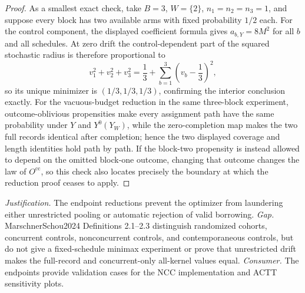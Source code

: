 \documentclass{article}
\begin{document}
\begin{proof}
As a smallest exact check, take \(B=3\), \(W=\{2\}\), \(n_1=n_2=n_3=1\), and suppose every block has two available arms with fixed probability \(1/2\) each.  For the control component, the displayed coefficient formula gives \(a_{b,Y}=8M^2\) for all \(b\) and all schedules.  At zero drift the control-dependent part of the squared stochastic radius is therefore proportional to
\[
 v_1^2+v_2^2+v_3^2
 =\frac13+\sum_{b=1}^3\left(v_b-\frac13\right)^2,
\]
so its unique minimizer is \((1/3,1/3,1/3)\), confirming the interior conclusion exactly.  For the vacuous-budget reduction in the same three-block experiment, outcome-oblivious propensities make every assignment path have the same probability under \(Y\) and \(Y^0(Y_W)\), while the zero-completion map makes the two full records identical after completion; hence the two displayed coverage and length identities hold path by path.  If the block-two propensity is instead allowed to depend on the omitted block-one outcome, changing that outcome changes the law of \(O^{\mathrm{cc}}\), so this check also locates precisely the boundary at which the reduction proof ceases to apply.
\end{proof}
\par\smallskip\noindent \textit{Justification.} The endpoint reductions prevent the optimizer from laundering either unrestricted pooling or automatic rejection of valid borrowing. \textit{Gap.} MarschnerSchou2024 Definitions 2.1--2.3 distinguish randomized cohorts, concurrent controls, nonconcurrent controls, and contemporaneous controls, but do not give a fixed-schedule minimax experiment or prove that unrestricted drift makes the full-record and concurrent-only all-kernel values equal. \textit{Consumer.} The endpoints provide validation cases for the NCC implementation and ACTT sensitivity plots.
\end{document}
